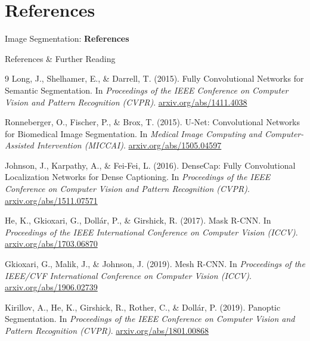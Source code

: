 \section{References}
\begin{frame}{}
    \LARGE Image Segmentation: \textbf{References}
\end{frame}

\begin{frame}[allowframebreaks]{References \& Further Reading}
    \begin{thebibliography}{9}
        Long, J., Shelhamer, E., \& Darrell, T. (2015). 
        \newblock Fully Convolutional Networks for Semantic Segmentation.
        \newblock In \emph{Proceedings of the IEEE Conference on Computer Vision and Pattern Recognition (CVPR)}.
        \newblock \href{https://arxiv.org/abs/1411.4038}{arxiv.org/abs/1411.4038}

        Ronneberger, O., Fischer, P., \& Brox, T. (2015).
        \newblock U-Net: Convolutional Networks for Biomedical Image Segmentation.
        \newblock In \emph{Medical Image Computing and Computer-Assisted Intervention (MICCAI)}.
        \newblock \href{https://arxiv.org/abs/1505.04597}{arxiv.org/abs/1505.04597}

        Johnson, J., Karpathy, A., \& Fei-Fei, L. (2016).
        \newblock DenseCap: Fully Convolutional Localization Networks for Dense Captioning.
        \newblock In \emph{Proceedings of the IEEE Conference on Computer Vision and Pattern Recognition (CVPR)}.
        \newblock \href{https://arxiv.org/abs/1511.07571}{arxiv.org/abs/1511.07571}

        He, K., Gkioxari, G., Dollár, P., \& Girshick, R. (2017).
        \newblock Mask R-CNN.
        \newblock In \emph{Proceedings of the IEEE International Conference on Computer Vision (ICCV)}.
        \newblock \href{https://arxiv.org/abs/1703.06870}{arxiv.org/abs/1703.06870}

        Gkioxari, G., Malik, J., \& Johnson, J. (2019).
        \newblock Mesh R-CNN.
        \newblock In \emph{Proceedings of the IEEE/CVF International Conference on Computer Vision (ICCV)}.
        \newblock \href{https://arxiv.org/abs/1906.02739}{arxiv.org/abs/1906.02739}

        Kirillov, A., He, K., Girshick, R., Rother, C., \& Dollár, P. (2019).
        \newblock Panoptic Segmentation.
        \newblock In \emph{Proceedings of the IEEE Conference on Computer Vision and Pattern Recognition (CVPR)}.
        \newblock \href{https://arxiv.org/abs/1801.00868}{arxiv.org/abs/1801.00868}


\end{thebibliography}
\end{frame}
